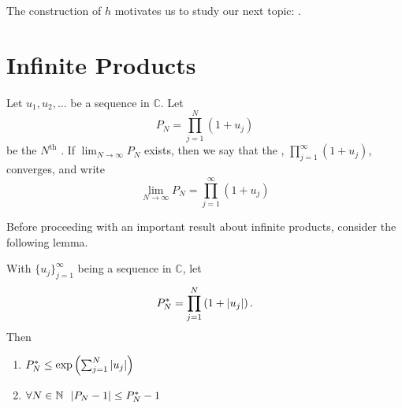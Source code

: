 \documentclass[notoc,notitlepage]{tufte-book}
\begin{document}
The construction of $h$ motivates us to study our next topic: .


\section{Infinite Products} %
\label{sec:infinite_products}

\begin{defn}\label{defn:infinite_products}
  Let $u_1, u_2, ...$ be a sequence in $\mathbb{C}$. Let
  \begin{equation*}
    P_N = \prod_{j=1}^{N} \left( 1 + u_j \right)
  \end{equation*}
  be the $N^{\text{th}}$ . If $\lim_{N \to \infty} P_N$ exists, then we say that the , $\prod_{j=1}^{\infty} \left(1 + u_j \right)$, converges, and write
  \begin{equation*}
    \lim_{N \to \infty} P_N = \prod_{j=1}^{\infty} \left( 1 + u_j \right)
  \end{equation*}
\end{defn}

Before proceeding with an important result about infinite products, consider the following lemma.

\begin{lemma}\label{lemma:bounds_of_the_partial_product}
  With $\{u_j\}_{j = 1}^{\infty}$ being a sequence in $\mathbb{C}$, let
  \begin{equation*}
    P_N^* = \prod_{j=1}^{N} \left(1 + \left|u_j\right| \right).
  \end{equation*}
  Then
  \begin{enumerate}
    \item $P_N^* \leq \exp{\left( \sum_{j=1}^{N} \left|u_j\right| \right)}$
    \item $\forall N \in \mathbb{N} \enspace \left|P_N - 1\right| \leq P_N^* - 1$
  \end{enumerate}
\end{lemma}
\end{document}
